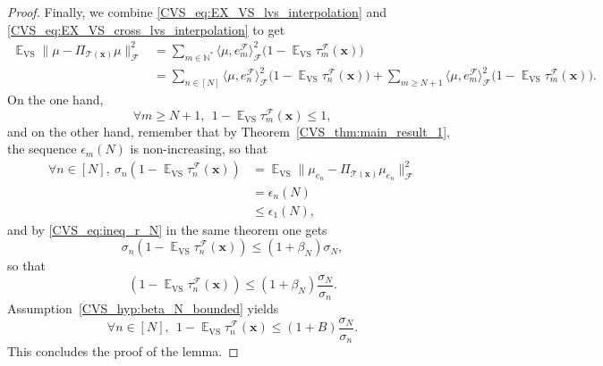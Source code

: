 \documentclass[twoside,11pt]{book}
\numberwithin{theorem}{chapter}
\numberwithin{definition}{chapter}
\numberwithin{proposition}{chapter}
\numberwithin{corollary}{chapter}
\numberwithin{example}{chapter}
\numberwithin{lemma}{chapter}
\numberwithin{assumption}{chapter}
\numberwithin{equation}{chapter}
\numberwithin{figure}{chapter}
\DeclareMathOperator{\VS}{\mathrm{VS}}
\DeclareMathOperator{\EX}{\mathbb{E}}
\DeclareMathOperator{\F}{\mathcal{F}}
\begin{document}
\begin{proof}
Finally, we combine \eqref{CVS_eq:EX_VS_lvs_interpolation} and \eqref{CVS_eq:EX_VS_cross_lvs_interpolation} to get
\begin{align}
\EX_{\VS}\|\mu - \Pi_{\mathcal{T}(\bm{x})} \mu\|_{\F}^{2} & = \sum\limits_{m \in \mathbb{N}^{*}} \langle \mu, e_{m}^{\F} \rangle_{\F}^{2}\bigg(1- \EX_{\VS}\tau_{m}^{\F}(\bm{x})\bigg) \nonumber\\
& = \sum\limits_{n \in [N]} \langle \mu, e_{n}^{\F} \rangle_{\F}^{2}\bigg(1- \EX_{\VS}\tau_{n}^{\F}(\bm{x})\bigg) + \sum\limits_{m \geq N+1} \langle \mu, e_{m}^{\F} \rangle_{\F}^{2}\bigg(1- \EX_{\VS}\tau_{m}^{\F}(\bm{x})\bigg).
\end{align}
On the one hand,
\begin{equation}
\forall m \geq N+1, \:\: 1- \EX_{\VS}\tau_{m}^{\F}(\bm{x}) \leq 1,
\end{equation}
and on the other hand, remember that by Theorem~\ref{CVS_thm:main_result_1}, the sequence $\epsilon_{m}(N)$ is non-increasing, so that
\begin{align}
\forall n \in [N], \: \sigma_{n} (1-\EX_{\VS} \tau_{n}^{\F}(\bm{x})) & = \EX_{\VS} \|\mu_{e_{n}} - \Pi_{\mathcal{T}(\bm{x})} \mu_{e_{n}}\|_{\F}^{2} \\
& = \epsilon_{n}(N) \\
& \leq \epsilon_{1}(N),
\end{align}
and by \eqref{CVS_eq:ineq_r_N} in the same theorem one gets
\begin{equation}
\sigma_{n} (1-\EX_{\VS} \tau_{n}^{\F}(\bm{x})) \leq (1+\beta_{N}) \sigma_{N},
\end{equation}
so that
\begin{equation}
 (1-\EX_{\VS} \tau_{n}^{\F}(\bm{x})) \leq (1+\beta_{N})\frac{ \sigma_{N}}{\sigma_{n}}.
\end{equation}
Assumption~\ref{CVS_hyp:beta_N_bounded} yields \
\begin{equation}
\forall n \in [N],\:\: 1- \EX_{\VS}\tau_{n}^{\F}(\bm{x}) \leq  (1+B) \frac{\sigma_{N}}{\sigma_{n}}.
\end{equation}
This concludes the proof of the lemma.
\end{proof}
\end{document}
